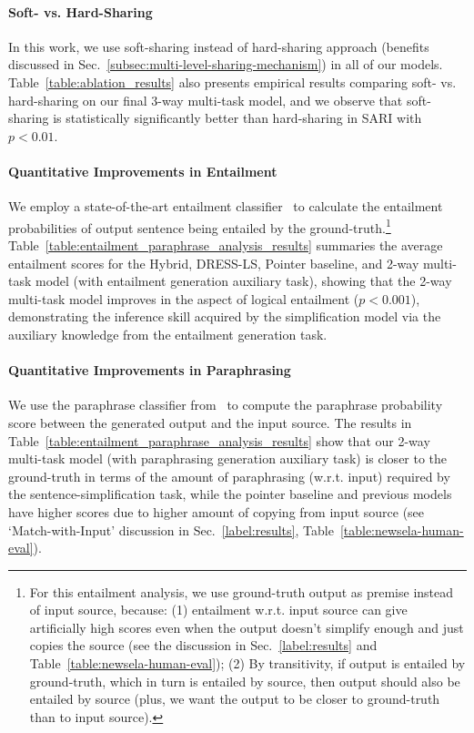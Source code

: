\documentclass[11pt]{article}
\begin{document}
\paragraph{Soft- vs. Hard-Sharing}
In this work, we use soft-sharing instead of hard-sharing approach (benefits discussed in Sec.~\ref{subsec:multi-level-sharing-mechanism}) in all of our models. Table~\ref{table:ablation_results} also presents empirical results comparing soft- vs. hard-sharing on our final 3-way multi-task model, and we observe that soft-sharing is statistically significantly better than hard-sharing in SARI with $p<0.01$.



\paragraph{Quantitative Improvements in Entailment}
We employ a state-of-the-art entailment classifier~\cite{chen2017enhanced} to calculate the entailment probabilities of output sentence being entailed by the ground-truth.\footnote{For this entailment analysis, we use ground-truth output as premise instead of input source, because: (1) entailment w.r.t. input source can give artificially high scores even when the output doesn't simplify enough and just copies the source (see the discussion in Sec.~\ref{label:results} and Table~\ref{table:newsela-human-eval}); (2) By transitivity, if output is entailed by ground-truth, which in turn is entailed by source, then output should also be entailed by source (plus, we want the output to be closer to ground-truth than to input source).}
Table~\ref{table:entailment_paraphrase_analysis_results} summaries the average entailment scores for the Hybrid, DRESS-LS, Pointer baseline, and 2-way multi-task model (with entailment generation auxiliary task), showing that the 2-way multi-task model improves in the aspect of logical entailment ($p<0.001$), demonstrating the inference skill acquired by the simplification model via the auxiliary knowledge from the entailment generation task.



\paragraph{Quantitative Improvements in Paraphrasing}
We use the paraphrase classifier from~ to compute the paraphrase probability score between the generated output and the input source. The results in Table~\ref{table:entailment_paraphrase_analysis_results} show that our 2-way multi-task model (with paraphrasing generation auxiliary task) is closer to the ground-truth in terms of the amount of paraphrasing (w.r.t. input) required by the sentence-simplification task, while the pointer baseline and previous models have higher scores due to higher amount of copying from input source (see `Match-with-Input' discussion in Sec.~\ref{label:results}, Table~\ref{table:newsela-human-eval}).
\end{document}
